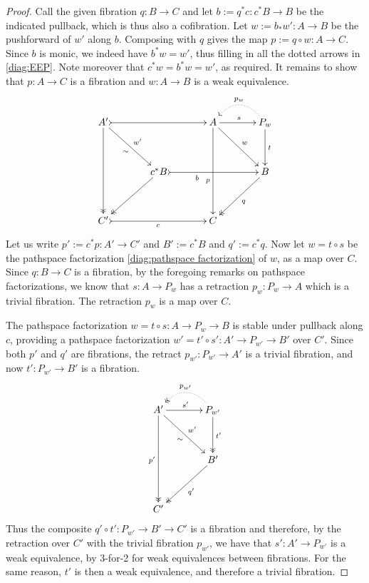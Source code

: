 \documentclass[12pt]{article}
\newcommand{\ra}{\ensuremath{\rightarrow}}
\theoremstyle{remark}
\theoremstyle{definition}
\begin{document}
\begin{proof}
Call the given fibration $q:B\ra C$ and let $b:=  q^*c : c^*B \ra B$ be the indicated pullback, which is thus also a cofibration. Let $w := b_*w' : A\ra B$ be the pushforward of $w'$ along $b$.  Composing with $q$ gives the map $p:= q\circ w:A\ra C$.  Since $b$ is monic, we indeed have $b^*w = w'$, thus filling in all the dotted arrows in \eqref{diag:EEP}.  Note moreover that $c^*w =  b^*w = w'$, as required. It remains to show that $p:A\ra C$ is a fibration and $w : A\ra B$ is a weak equivalence.   
\begin{equation}\label{diag:EEPfactored}
\xymatrix@=1.5em{
A' \ar@{->>}[dddd] \ar[rrdd]_{\sim}^{w'} \ar@{>->}[rrrr] && && A \ar[dddd]_>>>>>>>>>>>>p \ar[rrdd]^{w} \ar[rr]^s && \ar@{.>}@/_1.5pc/[ll]_{p_w} P_w \ar[dd]^t \\
\\
&& c^*B \ar@{->>}[lldd] \ar@{>->}[rrrr]_<<<<<<<<<<b  &&&& B \ar@{->>}[lldd]^q  \\
\\
C' \ar@{>->}[rrrr]_c &&&& C &&
}
\end{equation}
Let us write $p':= c^*p : A' \ra C'$ and $B' := c^*B$ and $q':= c^*q$.
Now let $w=t\circ s$ be the pathspace factorization \eqref{diag:pathspace factorization} of $w$, as a map over $C$.  Since $q:B \ra C$ is a fibration, by the foregoing remarks on pathspace factorizations, we know that $s : A\ra P_w$ has a retraction $p_w : P_w \ra A$ which is a trivial fibration.  The retraction $p_w$ is a map over $C$.  

The pathspace factorization $w=t\circ s : A \ra P_w \ra B$ is stable under pullback along $c$, providing a pathspace factorization $w'=t'\circ s' : A' \ra P_{w'} \ra B'$ over $C'$.  Since both $p'$ and $q'$ are fibrations, the retract $p_{w'}: P_{w'} \ra A'$ is a trivial fibration, and now $t' : P_{w'} \ra B'$ is a fibration.
\begin{equation}\label{diag:EEPfactored2}
\xymatrix@=1.5em{
A' \ar@{->>}[dddd]_{p'} \ar[rrdd]_{\sim}^{w'}  \ar[rr]^{s'} && \ar@{.>>}@/_1.5pc/[ll]_{p_{w'}} P_{w'} 
	\ar@{->>}[dd]^{t'} \\
\\
&& B' \ar@{->>}[lldd]^{q'} \\
\\
C' &&
}
\end{equation}
Thus the composite $q'\circ t' : P_{w'} \ra B' \ra C'$ is a fibration and therefore, by the retraction over $C'$ with the trivial fibration $p_{w'}$, we have that $s' : A' \ra P_{w'}$ is a weak equivalence, by 3-for-2 for weak equivalences between fibrations.  For the same reason, $t'$ is then a weak equivalence, and therefore a trivial fibration.


\end{proof}
\end{document}
